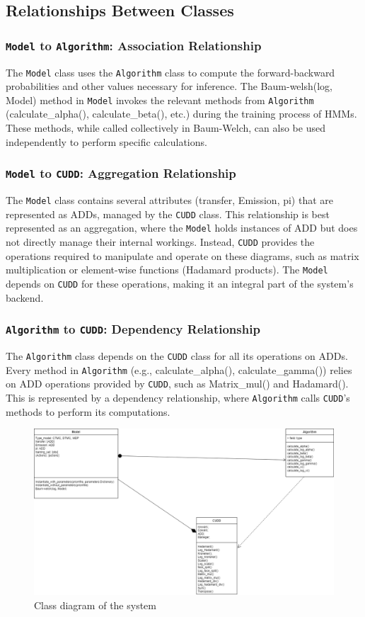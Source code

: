 \subsection{Relationships Between Classes}
\subsubsection{\texttt{Model} to \texttt{Algorithm}: Association Relationship}
The \texttt{Model} class uses the \texttt{Algorithm} class to compute the forward-backward probabilities and other values necessary for inference. 
The Baum-welsh(log, Model) method in \texttt{Model} invokes the relevant methods from \texttt{Algorithm} (calculate\_alpha(), calculate\_beta(), etc.) during the training process of HMMs. 
These methods, while called collectively in Baum-Welch, can also be used independently to perform specific calculations.

\subsubsection{\texttt{Model} to \texttt{CUDD}: Aggregation Relationship}
The \texttt{Model} class contains several attributes (transfer, Emission, pi) that are represented as ADDs, managed by the \texttt{CUDD} class.
This relationship is best represented as an aggregation, where the \texttt{Model} holds instances of ADD but does not directly manage their internal workings.
Instead, \texttt{CUDD} provides the operations required to manipulate and operate on these diagrams, such as matrix multiplication or element-wise functions (Hadamard products).
The \texttt{Model} depends on \texttt{CUDD} for these operations, making it an integral part of the system's backend.

\subsubsection{\texttt{Algorithm} to \texttt{CUDD}: Dependency Relationship}
The \texttt{Algorithm} class depends on the \texttt{CUDD} class for all its operations on ADDs.
Every method in \texttt{Algorithm} (e.g., calculate\_alpha(), calculate\_gamma()) relies on ADD operations provided by \texttt{CUDD}, such as Matrix\_mul() and Hadamard().
This is represented by a dependency relationship, where \texttt{Algorithm} calls \texttt{CUDD}'s methods to perform its computations.

\begin{figure}
    \centering
    \includegraphics[width=\columnwidth]{figures/class-diagram.png}
    \caption{Class diagram of the system}
    \label{fig:class-diagram}
\end{figure}